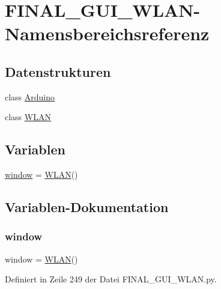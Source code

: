 \hypertarget{namespace_f_i_n_a_l___g_u_i___w_l_a_n}{}\section{F\+I\+N\+A\+L\+\_\+\+G\+U\+I\+\_\+\+W\+L\+A\+N-\/\+Namensbereichsreferenz}
\label{namespace_f_i_n_a_l___g_u_i___w_l_a_n}
\subsection*{Datenstrukturen}
\begin{DoxyCompactItemize}
\item 
class \hyperlink{class_f_i_n_a_l___g_u_i___w_l_a_n_1_1_arduino}{Arduino}
\item 
class \hyperlink{class_f_i_n_a_l___g_u_i___w_l_a_n_1_1_w_l_a_n}{W\+L\+AN}
\end{DoxyCompactItemize}
\subsection*{Variablen}
\begin{DoxyCompactItemize}
\item 
\hyperlink{namespace_f_i_n_a_l___g_u_i___w_l_a_n_a04a8a2bbfa9c15500892b8e5033d625b}{window} = \hyperlink{class_f_i_n_a_l___g_u_i___w_l_a_n_1_1_w_l_a_n}{W\+L\+AN}()
\end{DoxyCompactItemize}


\subsection{Variablen-\/\+Dokumentation}
\mbox{\label{namespace_f_i_n_a_l___g_u_i___w_l_a_n_a04a8a2bbfa9c15500892b8e5033d625b}} 
\subsubsection{\texorpdfstring{window}{window}}
{\footnotesize\ttfamily window = \hyperlink{class_f_i_n_a_l___g_u_i___w_l_a_n_1_1_w_l_a_n}{W\+L\+AN}()}



Definiert in Zeile 249 der Datei F\+I\+N\+A\+L\+\_\+\+G\+U\+I\+\_\+\+W\+L\+A\+N.\+py.

